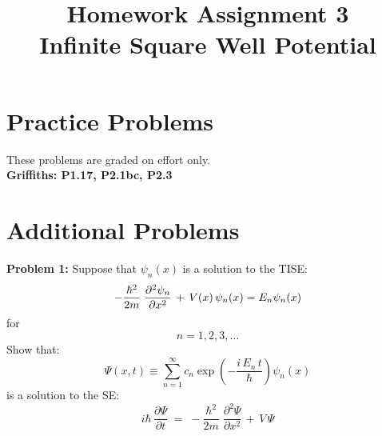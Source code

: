 \documentclass[12pt]{article}
\begin{document}
\newcommand{\ihbar}{\ensuremath{i \hbar}}
\newcommand{\dPsidt}{\ensuremath{ \frac{\partial \Psi}{\partial t} }}
\newcommand{\dPsidx}{\ensuremath{ \frac{\partial \Psi}{\partial x} }}
\newcommand{\ddPsidx}{\ensuremath{ \frac{\partial^2 \Psi}{\partial x^2} }}
\newcommand{\dPssdt}{\ensuremath{ \frac{\partial \Psi^*}{\partial t} }}
\newcommand{\dPssdx}{\ensuremath{ \frac{\partial \Psi^*}{\partial x} }}
\newcommand{\ddPssdx}{\ensuremath{ \frac{\partial^2 \Psi^*}{\partial x^2} }}

\newcommand{\dphidt}{\ensuremath{ \frac{d \phi}{dt} }}
\newcommand{\dpsidx}{\ensuremath{ \frac{d \psi}{dx} }}
\newcommand{\ddpsidx}{\ensuremath{ \frac{d^2 \psi}{dx^2} }}


\date{\vspace{-5ex}}

\title{Homework Assignment 3 \\ Infinite Square Well Potential}

\maketitle

\section*{Practice Problems}

These problems are graded on effort only.\\

\noindent
{\bf Griffiths: P1.17, P2.1bc, P2.3} \\

\section*{Additional Problems}

\noindent
{\bf Problem 1:} Suppose that $\psi_n(x)$ is a solution to the TISE:
 $$- \frac{\hbar^2}{2 m} \; \frac{\partial^2 \psi_n}{\partial x^2} \, + \, V(x) \, \psi_n(x) = E_n \psi_n(x)\\$$
for 
$$n=1,2,3,\ldots$$  
Show that:
 $$ \Psi(x,t) \equiv \sum_{n=1}^{\infty} c_n \exp\left( -\frac{i \, E_n \, t}{\hbar}\right)\psi_n(x) $$
is a solution to the SE:
$$\ihbar \, \dPsidt \; = \; - \frac{\hbar^2}{2 m} \; \ddPsidx \, + \, V \, \Psi$$

\vskip 0.5cm
\end{document}

